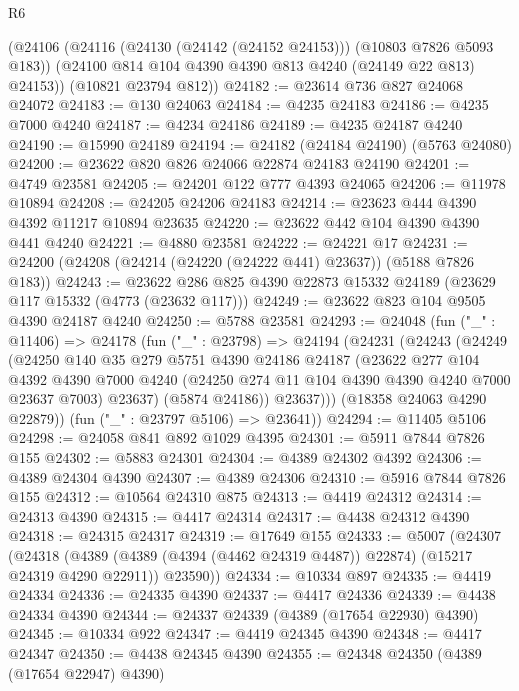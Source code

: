 \begin{lexlean}{R6}
\begin{coremodule}
      (@24106
        (@24116 (@24130 (@24142 (@24152 @24153))) (@10803 @7826 @5093 @183))
        (@24100 @814 @104 @4390 @4390 @813 @4240 (@24149 @22 @813) @24153))
      (@10821 @23794 @812))
@24182 := @23614 @736 @827 @24068 @24072
@24183 := @130 @24063
@24184 := @4235 @24183
@24186 := @4235 @7000 @4240
@24187 := @4234 @24186
@24189 := @4235 @24187 @4240
@24190 := @15990 @24189
@24194 := @24182 (@24184 @24190) (@5763 @24080)
@24200 := @23622 @820 @826 @24066 @22874 @24183 @24190
@24201 := @4749 @23581
@24205 := @24201 @122 @777 @4393 @24065
@24206 := @11978 @10894
@24208 := @24205 @24206 @24183
@24214 := @23623 @444 @4390 @4392 @11217 @10894 @23635
@24220 := @23622 @442 @104 @4390 @4390 @441 @4240
@24221 := @4880 @23581
@24222 := @24221 @17
@24231 := @24200 (@24208 (@24214 (@24220 (@24222 @441) @23637)) (@5188 @7826 @183))
@24243 := @23622 @286 @825 @4390 @22873 @15332 @24189 (@23629 @117 @15332 (@4773 (@23632 @117)))
@24249 := @23622 @823 @104 @9505 @4390 @24187 @4240
@24250 := @5788 @23581
@24293 := @24048
    (fun ("_" : @11406) =>
    @24178
      (fun ("_" : @23798) =>
      @24194
        (@24231
          (@24243
            (@24249
              (@24250
                @140
                @35
                @279
                @5751
                @4390
                @24186
                @24187
                (@23622
                  @277
                  @104
                  @4392
                  @4390
                  @7000
                  @4240
                  (@24250 @274 @11 @104 @4390 @4390 @4240 @7000 @23637 @7003)
                  @23637)
                (@5874 @24186))
              @23637)))
        (@18358 @24063 @4290 @22879))
      (fun ("_" : @23797 @5106) => @23641))
@24294 := @11405 @5106
@24298 := @24058 @841 @892 @1029 @4395
@24301 := @5911 @7844 @7826 @155
@24302 := @5883 @24301
@24304 := @4389 @24302 @4392
@24306 := @4389 @24304 @4390
@24307 := @4389 @24306
@24310 := @5916 @7844 @7826 @155
@24312 := @10564 @24310 @875
@24313 := @4419 @24312
@24314 := @24313 @4390
@24315 := @4417 @24314
@24317 := @4438 @24312 @4390
@24318 := @24315 @24317
@24319 := @17649 @155
@24333 := @5007
    (@24307
      (@24318
        (@4389 (@4389 (@4394 (@4462 @24319 @4487)) @22874) (@15217 @24319 @4290 @22911))
        @23590))
@24334 := @10334 @897
@24335 := @4419 @24334
@24336 := @24335 @4390
@24337 := @4417 @24336
@24339 := @4438 @24334 @4390
@24344 := @24337 @24339 (@4389 (@17654 @22930) @4390)
@24345 := @10334 @922
@24347 := @4419 @24345 @4390
@24348 := @4417 @24347
@24350 := @4438 @24345 @4390
@24355 := @24348 @24350 (@4389 (@17654 @22947) @4390)

\end{coremodule}
\end{lexlean}
